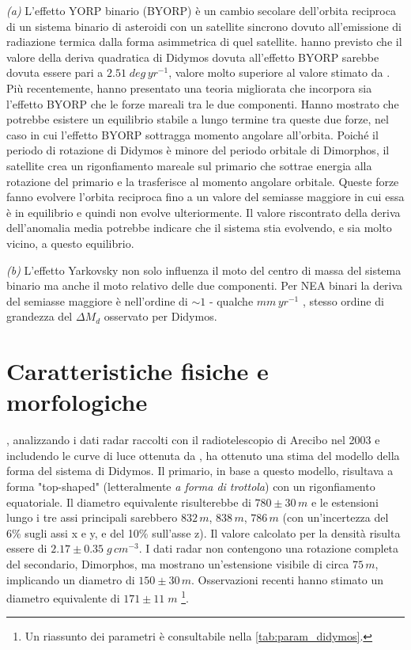 \documentclass[a4paper,11pt,openright]{book}
\begin{document}
\qquad \textit{(a)} L'effetto YORP binario (BYORP) è un cambio secolare dell'orbita reciproca di un sistema binario di asteroidi con un satellite sincrono dovuto all'emissione di radiazione termica dalla forma asimmetrica di quel satellite. \citet{pravec_binary_2010} hanno previsto che il valore della deriva quadratica di Didymos dovuta all'effetto BYORP sarebbe dovuta essere pari a $2.51\;deg\,yr^{-1}$, valore molto superiore al valore stimato da \citet{scheirich_preimpact_2022}. Più recentemente, \citet{jacobson_dynamics_2011} hanno presentato una teoria migliorata che incorpora sia l'effetto BYORP che le forze mareali tra le due componenti. Hanno mostrato che potrebbe esistere un equilibrio stabile a lungo termine tra queste due forze, nel caso in cui l'effetto BYORP sottragga momento angolare all'orbita. Poiché il periodo di rotazione di Didymos è minore del periodo orbitale di Dimorphos, il satellite crea un rigonfiamento mareale sul primario che sottrae energia alla rotazione del primario e la trasferisce al momento angolare orbitale. Queste forze fanno evolvere l'orbita reciproca fino a un valore del semiasse maggiore in cui essa è in equilibrio e quindi non evolve ulteriormente. Il valore riscontrato della deriva dell'anomalia media potrebbe indicare che il sistema stia evolvendo, e sia molto vicino, a questo equilibrio.

\qquad \textit{(b)} L'effetto Yarkovsky non solo influenza il moto del centro di massa del sistema binario ma anche il moto relativo delle due componenti. Per NEA binari la deriva del semiasse maggiore è nell'ordine di $\sim 1$ - qualche $mm\,yr^{-1}$ \citep{scheirich_satellite_2021}, stesso ordine di grandezza del $\Delta M_d$ osservato per Didymos.

\section{Caratteristiche fisiche e morfologiche}
\citet{naidu_radar_2020}, analizzando i dati radar raccolti con il radiotelescopio di Arecibo nel 2003 e includendo le curve di luce ottenuta da \citet{pravec_photometric_2006}, ha ottenuto una stima del modello della forma del sistema di Didymos. Il primario, in base a questo modello, risultava a forma "top-shaped" (letteralmente \textit{a forma di trottola}) con un rigonfiamento equatoriale. Il diametro equivalente risulterebbe di $780\pm 30\,m$ e le estensioni lungo i tre assi principali sarebbero $832\,m$, $838\,m$, $786\,m$ (con un'incertezza del 6\% sugli assi x e y, e del 10\% sull'asse z). Il valore calcolato per la densità risulta essere di $2.17\pm 0.35\;g\,cm^{-3}$. I dati radar non contengono una rotazione completa del secondario, Dimorphos, ma mostrano un'estensione visibile di circa $75\,m$, implicando un diametro di $150\pm 30\,m$. Osservazioni recenti hanno stimato un diametro equivalente di $171\pm 11\; m$ \citep{scheirich_preimpact_2022}\footnote{Un riassunto dei parametri è consultabile nella \cref{tab:param_didymos}.}.
\end{document}
